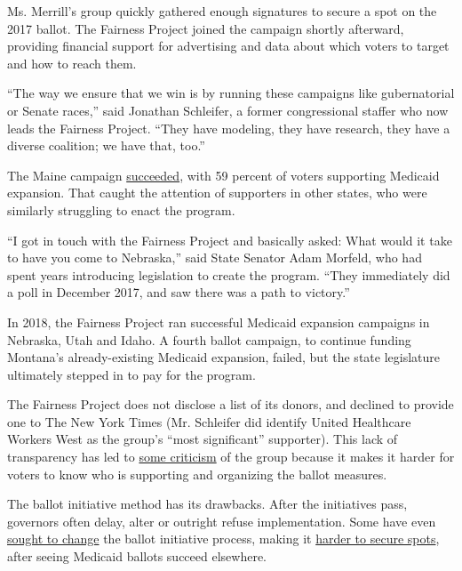 Ms. Merrill's group quickly gathered enough signatures to secure a spot
on the 2017 ballot. The Fairness Project joined the campaign shortly
afterward, providing financial support for advertising and data about
which voters to target and how to reach them.

``The way we ensure that we win is by running these campaigns like
gubernatorial or Senate races,'' said Jonathan Schleifer, a former
congressional staffer who now leads the Fairness Project. ``They have
modeling, they have research, they have a diverse coalition; we have
that, too.''

The Maine campaign
\href{https://www.nytimes3xbfgragh.onion/elections/results/maine-ballot-measure-medicaid-expansion}{succeeded},
with 59 percent of voters supporting Medicaid expansion. That caught the
attention of supporters in other states, who were similarly struggling
to enact the program.

``I got in touch with the Fairness Project and basically asked: What
would it take to have you come to Nebraska,'' said State Senator Adam
Morfeld, who had spent years introducing legislation to create the
program. ``They immediately did a poll in December 2017, and saw there
was a path to victory.''

In 2018, the Fairness Project ran successful Medicaid expansion
campaigns in Nebraska, Utah and Idaho. A fourth ballot campaign, to
continue funding Montana's already-existing Medicaid expansion, failed,
but the state legislature ultimately stepped in to pay for the program.

The Fairness Project does not disclose a list of its donors, and
declined to provide one to The New York Times (Mr. Schleifer did
identify United Healthcare Workers West as the group's ``most
significant'' supporter). This lack of transparency has led to
\href{https://www.idahostatesman.com/news/politics-government/state-politics/article228258029.html}{some
criticism} of the group because it makes it harder for voters to know
who is supporting and organizing the ballot measures.

The ballot initiative method has its drawbacks. After the initiatives
pass, governors often delay, alter or outright refuse implementation.
Some have even
\href{https://www.idahostatesman.com/news/politics-government/state-politics/article227828559.html}{sought
to change} the ballot initiative process, making it
\href{https://www.theledger.com/news/20190812/medicaid-ballot-proposal-pushed-back-to-2022}{harder
to secure spots}, after seeing Medicaid ballots succeed elsewhere.

